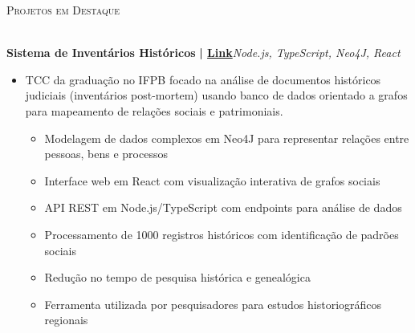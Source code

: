 \documentclass[a4paper]{article}
\newcommand{\lineunder}{
    \vspace*{-8pt} \\
    \hspace*{-18pt} \hrulefill \\
}
\newcommand{\header}[1]{
    {\hspace*{-18pt}\vspace*{6pt} \textsc{#1}}
    \vspace*{-6pt} \lineunder
}
\begin{document}
%
%
\header{Projetos em Destaque}
\vspace{1mm}

{\textbf{Sistema de Inventários Históricos}}\textbf{ | \href{https://repositorio.ifpb.edu.br/handle/177683/2898}{Link}}\hfill{\sl Node.js, TypeScript, Neo4J, React}\\
\vspace{-3mm}
\begin{itemize} \itemsep -3pt
    \item[] TCC da graduação no IFPB focado na análise de documentos históricos judiciais (inventários post-mortem) usando banco de dados orientado a grafos para mapeamento de relações sociais e patrimoniais.
        \begin{itemize}
            \item Modelagem de dados complexos em Neo4J para representar relações entre pessoas, bens e processos
            \item Interface web em React com visualização interativa de grafos sociais
            \item API REST em Node.js/TypeScript com endpoints para análise de dados
            \item Processamento de 1000 registros históricos com identificação de padrões sociais
            \item Redução no tempo de pesquisa histórica e genealógica
            \item Ferramenta utilizada por pesquisadores para estudos historiográficos regionais
        \end{itemize}
\end{itemize}
\vspace*{2mm}
\end{document}
